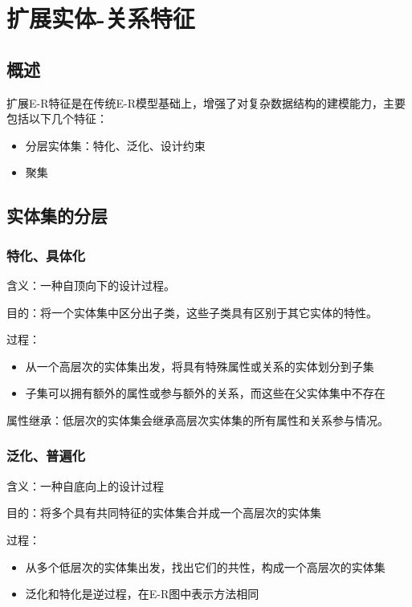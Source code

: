 \section{扩展实体-关系特征}

\subsection{概述}

扩展E-R特征是在传统E-R模型基础上，增强了对复杂数据结构的建模能力，主要包括以下几个特征：
\begin{itemize}
    \item 分层实体集：特化、泛化、设计约束
    \item 聚集
\end{itemize}

\subsection{实体集的分层}

\subsubsection{特化、具体化}

含义：一种自顶向下的设计过程。

目的：将一个实体集中区分出子类，这些子类具有区别于其它实体的特性。

过程：
\begin{itemize}
    \item 从一个高层次的实体集出发，将具有特殊属性或关系的实体划分到子集
    \item 子集可以拥有额外的属性或参与额外的关系，而这些在父实体集中不存在
\end{itemize}

属性继承：低层次的实体集会继承高层次实体集的所有属性和关系参与情况。

\subsubsection{泛化、普遍化}

含义：一种自底向上的设计过程

目的：将多个具有共同特征的实体集合并成一个高层次的实体集

过程：
\begin{itemize}
    \item 从多个低层次的实体集出发，找出它们的共性，构成一个高层次的实体集
    \item 泛化和特化是逆过程，在E-R图中表示方法相同
\end{itemize}

